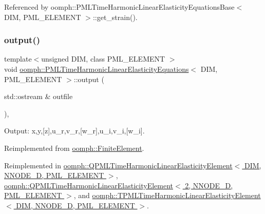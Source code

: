 Referenced by oomph\+::\+P\+M\+L\+Time\+Harmonic\+Linear\+Elasticity\+Equations\+Base$<$ D\+I\+M, P\+M\+L\+\_\+\+E\+L\+E\+M\+E\+N\+T $>$\+::get\+\_\+strain().

\mbox{\label{classoomph_1_1PMLTimeHarmonicLinearElasticityEquations_ab033b94bb8665cb782011cf4f12824e9}} 
\subsubsection{\texorpdfstring{output()}{output()}\hspace{0.1cm}{\footnotesize\ttfamily [1/4]}}
{\footnotesize\ttfamily template$<$unsigned D\+IM, class P\+M\+L\+\_\+\+E\+L\+E\+M\+E\+NT $>$ \\
void \hyperlink{classoomph_1_1PMLTimeHarmonicLinearElasticityEquations}{oomph\+::\+P\+M\+L\+Time\+Harmonic\+Linear\+Elasticity\+Equations}$<$ D\+IM, P\+M\+L\+\_\+\+E\+L\+E\+M\+E\+NT $>$\+::output (\begin{DoxyParamCaption}\item[{std\+::ostream \&}]{outfile }\end{DoxyParamCaption})\hspace{0.3cm}{\ttfamily [inline]}, {\ttfamily [virtual]}}



Output\+: x,y,\mbox{[}z\mbox{]},u\+\_\+r,v\+\_\+r,\mbox{[}w\+\_\+r\mbox{]},u\+\_\+i,v\+\_\+i,\mbox{[}w\+\_\+i\mbox{]}. 



Reimplemented from \hyperlink{classoomph_1_1FiniteElement_a2ad98a3d2ef4999f1bef62c0ff13f2a7}{oomph\+::\+Finite\+Element}.



Reimplemented in \hyperlink{classoomph_1_1QPMLTimeHarmonicLinearElasticityElement_a810b433071811f8f79e998e6f418e7fb}{oomph\+::\+Q\+P\+M\+L\+Time\+Harmonic\+Linear\+Elasticity\+Element$<$ D\+I\+M, N\+N\+O\+D\+E\+\_\+D, P\+M\+L\+\_\+\+E\+L\+E\+M\+E\+N\+T $>$}, \hyperlink{classoomph_1_1QPMLTimeHarmonicLinearElasticityElement_a810b433071811f8f79e998e6f418e7fb}{oomph\+::\+Q\+P\+M\+L\+Time\+Harmonic\+Linear\+Elasticity\+Element$<$ 2, N\+N\+O\+D\+E\+\_\+D, P\+M\+L\+\_\+\+E\+L\+E\+M\+E\+N\+T $>$}, and \hyperlink{classoomph_1_1TPMLTimeHarmonicLinearElasticityElement_a9206d6dda1bade58f9cd4dba3e6c645d}{oomph\+::\+T\+P\+M\+L\+Time\+Harmonic\+Linear\+Elasticity\+Element$<$ D\+I\+M, N\+N\+O\+D\+E\+\_\+D, P\+M\+L\+\_\+\+E\+L\+E\+M\+E\+N\+T $>$}.



